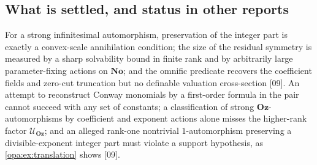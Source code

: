 \documentclass[11pt,oneside]{article}
\numberwithin{equation}{section}
\theoremstyle{definition}
\theoremstyle{remark}
\newcommand{\No}{\mathbf{No}}
\newcommand{\Oz}{\mathbf{Oz}}
\newcommand{\UU}{\mathcal U}
\newcommand{\src}[1]{\textup{\textsf{\small[#1]}}}
\begin{document}
\subsection{What is settled, and status in other reports}\label{opa:sub:status}

For a strong infinitesimal automorphism, preservation of the integer part is
exactly a convex-scale annihilation condition; the size of the residual symmetry is
measured by a sharp solvability bound in finite rank and by arbitrarily large
parameter-fixing actions on $\No$; and the omnific predicate recovers the
coefficient fields and zero-cut truncation but no definable valuation
cross-section \src{09}. An attempt to reconstruct Conway monomials by a
first-order formula in the pair cannot succeed with any set of constants; a
classification of strong $\Oz$-automorphisms by coefficient and exponent actions
alone misses the higher-rank factor $\UU_\Oz$; and an alleged rank-one
nontrivial $1$-automorphism preserving a divisible-exponent integer part must violate
a support hypothesis, as \cref{opa:ex:translation} shows \src{09}.
\end{document}
